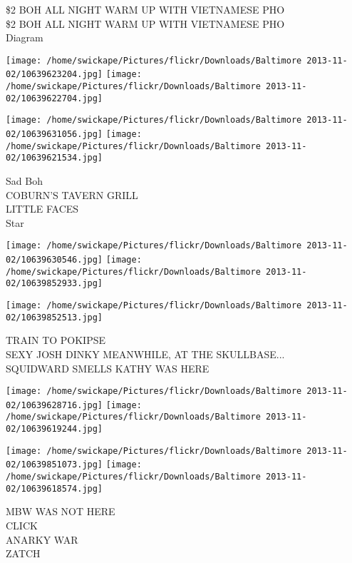 \documentclass[10pt,letterpaper]{article}
\begin{document}
\$2 BOH ALL NIGHT WARM UP WITH VIETNAMESE PHO\\
\$2 BOH ALL NIGHT WARM UP WITH VIETNAMESE PHO\\
Diagram\\
\pagebreak

\texttt{[image: /home/swickape/Pictures/flickr/Downloads/Baltimore 2013-11-02/10639623204.jpg]}
\texttt{[image: /home/swickape/Pictures/flickr/Downloads/Baltimore 2013-11-02/10639622704.jpg]}

\texttt{[image: /home/swickape/Pictures/flickr/Downloads/Baltimore 2013-11-02/10639631056.jpg]}
\texttt{[image: /home/swickape/Pictures/flickr/Downloads/Baltimore 2013-11-02/10639621534.jpg]}

Sad Boh\\
COBURN'S TAVERN GRILL\\
LITTLE FACES\\
Star\\
\pagebreak

\texttt{[image: /home/swickape/Pictures/flickr/Downloads/Baltimore 2013-11-02/10639630546.jpg]}
\texttt{[image: /home/swickape/Pictures/flickr/Downloads/Baltimore 2013-11-02/10639852933.jpg]}

\vspace{0.25in}
\texttt{[image: /home/swickape/Pictures/flickr/Downloads/Baltimore 2013-11-02/10639852513.jpg]}

TRAIN TO POKIPSE\\
SEXY JOSH DINKY MEANWHILE, AT THE SKULLBASE...\\
SQUIDWARD SMELLS KATHY WAS HERE\\
\pagebreak

\texttt{[image: /home/swickape/Pictures/flickr/Downloads/Baltimore 2013-11-02/10639628716.jpg]}
\texttt{[image: /home/swickape/Pictures/flickr/Downloads/Baltimore 2013-11-02/10639619244.jpg]}

\texttt{[image: /home/swickape/Pictures/flickr/Downloads/Baltimore 2013-11-02/10639851073.jpg]}
\texttt{[image: /home/swickape/Pictures/flickr/Downloads/Baltimore 2013-11-02/10639618574.jpg]}

MBW WAS NOT HERE\\
CLICK\\
ANARKY WAR\\
ZATCH\\
\pagebreak
\end{document}
